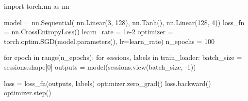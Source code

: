 \begin{mypython}[float={h}, caption={Modelo de la red y enrenamiento con los datos artificiales.}, label={code:model}]
  import torch.nn as nn

  model = nn.Sequential(
  nn.Linear(3, 128),
  nn.Tanh(),
  nn.Linear(128, 4))
  loss_fn = nn.CrossEntropyLoss()
  learn_rate = 1e-2
  optimizer = torch.optim.SGD(model.parameters(), lr=learn_rate)
  n_epochs = 100

  for epoch in range(n_epochs):
  for sessions, labels in train_loader:
  batch_size = sessions.shape[0]
  outputs = model(sessions.view(batch_size, -1))

  loss = loss_fn(outputs, labels)
  optimizer.zero_grad()
  loss.backward()
  optimizer.step()
\end{mypython}

